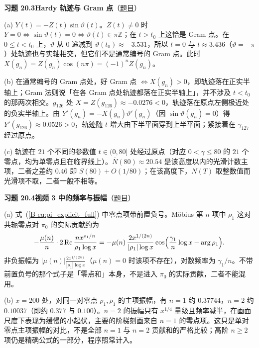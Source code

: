 \documentclass[11pt,a4paper]{article}
\renewcommand{\Re}{\operatorname{Re}}
\newcommand{\bref}[1]{\ref*{B-#1}}
\newcommand{\Sol}[2]{%
  \par\addvspace{1.2em}\noindent
  \hypertarget{s:#1}{}\textbf{习题 #1\quad #2}\hfill{\small（\hyperlink{q:#1}{题目}）}\par
  \nopagebreak\smallskip}
\begin{document}
\Sol{20.3}{Hardy 轨迹与 Gram 点}
(a) $Y(t)=-Z(t)\sin\vartheta(t)$。$Z(t)\neq0$ 时 $Y=0\iff\sin\vartheta(t)=0\iff\vartheta(t)\in\pi\mathbb Z$；在 $t>t_0$ 上这恰是 Gram 点。在 $0\le t<t_0$ 上，$\vartheta$ 从 $0$ 递减到 $\vartheta(t_0)\approx-3.531$，所以 $t=0$ 与 $t\approx3.436$（$\vartheta=-\pi$）处轨迹也与实轴相交，但它们不是通常编号的 Gram 点。此时 $X(g_n)=Z(g_n)\cos(n\pi)=(-1)^nZ(g_n)$。

(b) 在通常编号的 Gram 点处，好 Gram 点 $\iff X(g_n)>0$，即轨迹落在正实半轴上；Gram 法则说「在各 Gram 点处轨迹都落在正实半轴上」，并不涉及 $t<t_0$ 的那两次相交。$g_{126}$ 处 $X=Z(g_{126})\approx-0.0276<0$，轨迹落在原点左侧极近处的负实半轴上。由 $Y'(g_n)=-X(g_n)\vartheta'(g_n)$（因 $\sin\vartheta(g_n)=0$）得 $Y'(g_{126})\approx0.0526>0$，轨迹随 $t$ 增大由下半平面穿到上半平面；紧接着在 $\gamma_{127}$ 经过原点。

(c) 轨迹在 $21$ 个不同的参数值 $t\in(0,80]$ 处经过原点（对应 $0<\gamma\le80$ 的 $21$ 个零点，均为单零点且在临界线上）。$\bar N(80)\approx20.54$ 是该高度以内的光滑计数主项，二者之差约 $0.46$ 即 $S(80)+O(1/80)$；在该高度下，$N(T)$ 取整数值而光滑项不取，二者一般不相等。

\Sol{20.4}{视频 3 中的频率与振幅}
(a) 式~(\bref{eq:pi_explicit_full}) 中零点项带前置负号。Möbius 第 $n$ 项中 $\rho_1$ 这对共轭零点对 $\pi_0$ 的实际贡献约为
\[
  -\frac{\mu(n)}n\cdot2\Re\frac{nx^{\rho_1/n}}{\rho_1\log x}=-\mu(n)\,\frac{2x^{1/(2n)}}{|\rho_1|\log x}\cos\Bigl(\frac{\gamma_1}n\log x-\arg\rho_1\Bigr).
\]
非负振幅为 $|\mu(n)|\frac{2x^{1/(2n)}}{|\rho_1|\log x}$（$\mu(n)=0$ 时该项不存在），对数频率为 $\gamma_1/n$。不带前置负号的那个式子是「零点和」本身，不是进入 $\pi_0$ 的实际贡献，二者不能混用。

(b) $x=200$ 处，对同一对零点 $\rho_1,\bar\rho_1$ 的主项振幅，有 $n=1$ 约 $0.37744$，$n=2$ 约 $0.10037$（即约 $0.377$ 与 $0.100$）。$n=2$ 的振幅只有 $x^{1/4}$ 量级且频率减半，在画面尺度下表现为缓慢的小起伏，主要的阶梯刻画来自 $n=1$ 的零点项。这只是单对零点主项振幅的对比，不是全部 $n=1$ 与 $n=2$ 贡献和的严格比较；高阶 $n\ge2$ 项仍是精确公式的一部分，程序照常计入。
\end{document}
